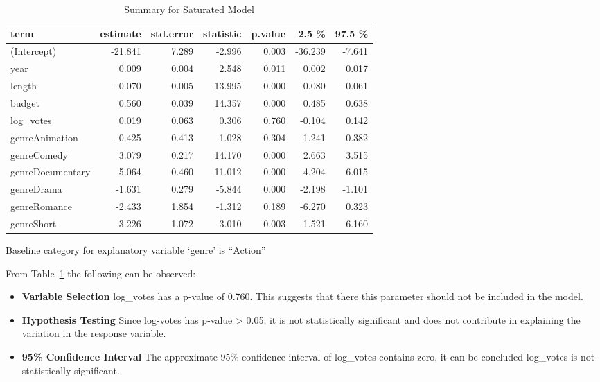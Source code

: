 \documentclass[
  letterpaper,
  DIV=11,
  numbers=noendperiod]{scrartcl}
\begin{document}
\hypertarget{tbl-m0_model-Summary}{}
\begin{longtable}{lrrrrrr}
\caption{\label{tbl-m0_model-Summary}Summary for Saturated Model }\tabularnewline

\toprule
term & estimate & std.error & statistic & p.value & 2.5 \% & 97.5 \% \\ 
\midrule\addlinespace[2.5pt]
(Intercept) & -21.841 & 7.289 & -2.996 & 0.003 & -36.239 & -7.641 \\ 
year & 0.009 & 0.004 & 2.548 & 0.011 & 0.002 & 0.017 \\ 
length & -0.070 & 0.005 & -13.995 & 0.000 & -0.080 & -0.061 \\ 
budget & 0.560 & 0.039 & 14.357 & 0.000 & 0.485 & 0.638 \\ 
log\_votes & 0.019 & 0.063 & 0.306 & 0.760 & -0.104 & 0.142 \\ 
genreAnimation & -0.425 & 0.413 & -1.028 & 0.304 & -1.241 & 0.382 \\ 
genreComedy & 3.079 & 0.217 & 14.170 & 0.000 & 2.663 & 3.515 \\ 
genreDocumentary & 5.064 & 0.460 & 11.012 & 0.000 & 4.204 & 6.015 \\ 
genreDrama & -1.631 & 0.279 & -5.844 & 0.000 & -2.198 & -1.101 \\ 
genreRomance & -2.433 & 1.854 & -1.312 & 0.189 & -6.270 & 0.323 \\ 
genreShort & 3.226 & 1.072 & 3.010 & 0.003 & 1.521 & 6.160 \\ 
\bottomrule
\end{longtable}

Baseline category for explanatory variable `genre' is ``Action''

From Table~\ref{tbl-m0_model-Summary} the following can be observed:

\begin{itemize}
\item
  \textbf{Variable Selection} log\_votes has a p-value of 0.760. This
  suggests that there this parameter should not be included in the
  model.
\item
  \textbf{Hypothesis Testing} Since log-votes has p-value \textgreater{}
  0.05, it is not statistically significant and does not contribute in
  explaining the variation in the response variable.
\item
  \textbf{95\% Confidence Interval} The approximate 95\% confidence
  interval of log\_votes contains zero, it can be concluded log\_votes
  is not statistically significant.
\end{itemize}
\end{document}
